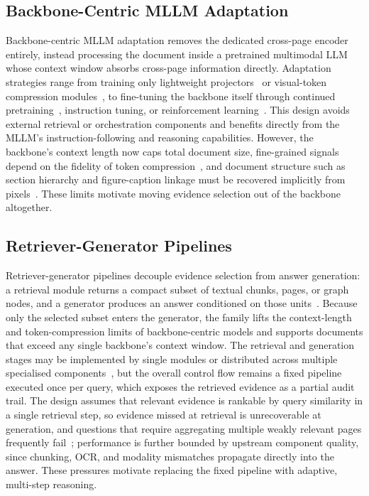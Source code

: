 \documentclass[11pt]{article}
\begin{document}
\subsection{Backbone-Centric MLLM Adaptation}
Backbone-centric MLLM adaptation removes the dedicated cross-page encoder entirely, instead processing the document inside a pretrained multimodal LLM whose context window absorbs cross-page information directly. Adaptation strategies range from training only lightweight projectors~\cite{tanaka2024instructdoc} or visual-token compression modules~\cite{hu2025mplug2}, to fine-tuning the backbone itself through continued pretraining~\cite{duan2025docopilot}, instruction tuning, or reinforcement learning~\cite{xiong2026docr1}. This design avoids external retrieval or orchestration components and benefits directly from the MLLM's instruction-following and reasoning capabilities. However, the backbone's context length now caps total document size, fine-grained signals depend on the fidelity of token compression~\cite{jia2024leopard}, and document structure such as section hierarchy and figure-caption linkage must be recovered implicitly from pixels~\cite{hannan2025docslm}. These limits motivate moving evidence selection out of the backbone altogether.

\subsection{Retriever-Generator Pipelines}
Retriever-generator pipelines decouple evidence selection from answer generation: a retrieval module returns a compact subset of textual chunks, pages, or graph nodes, and a generator produces an answer conditioned on those units~\cite{cho2024m3docrag,tanaka2025vdocrag}. Because only the selected subset enters the generator, the family lifts the context-length and token-compression limits of backbone-centric models and supports documents that exceed any single backbone's context window. The retrieval and generation stages may be implemented by single modules or distributed across multiple specialised components~\cite{wang2024knowledge,duan2025m2rag,han2025mdocagent}, but the overall control flow remains a fixed pipeline executed once per query, which exposes the retrieved evidence as a partial audit trail. The design assumes that relevant evidence is rankable by query similarity in a single retrieval step, so evidence missed at retrieval is unrecoverable at generation, and questions that require aggregating multiple weakly relevant pages frequently fail~\cite{wu2025molorag}; performance is further bounded by upstream component quality, since chunking, OCR, and modality mismatches propagate directly into the answer. These pressures motivate replacing the fixed pipeline with adaptive, multi-step reasoning.
\end{document}
